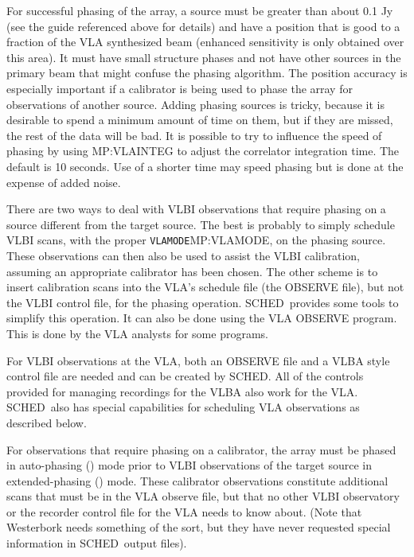 \documentclass{report}
\newcommand{\sched}{{\sc SCHED}}
\newcommand{\schedb}{{\sc SCHED~}}
\begin{document}
For successful phasing of the array, a source must be greater than
about 0.1 Jy (see the guide referenced above for details) and have a
position that is good to a fraction of the VLA synthesized beam
(enhanced sensitivity is only obtained over this area).  It must have
small structure phases and not have other sources in the primary beam
that might confuse the phasing algorithm.  The position accuracy is
especially important if a calibrator is being used to phase the array
for observations of another source.  Adding phasing sources is tricky,
because it is desirable to spend a minimum amount of time on them, but
if they are missed, the rest of the data will be bad.  It is possible
to try to influence the speed of phasing by using 
{MP:VLAINTEG} to adjust the correlator integration time.  The default
is 10 seconds.  Use of a shorter time may speed phasing but is done at
the expense of added noise.

There are two ways to deal with VLBI observations that require
phasing on a source different from the target source.  The best
is probably to simply schedule VLBI scans, with the proper \htmlref
{{\tt VLAMODE}}{MP:VLAMODE}, on the phasing source.  These observations
can then also be used to assist the VLBI calibration, assuming an
appropriate calibrator has been chosen.  The other scheme is to
insert calibration scans into the VLA's schedule file (the OBSERVE
file), but not the VLBI control file, for the phasing operation.
\schedb provides some tools to simplify this operation.  It can
also be done using the {\sc VLA OBSERVE} program.  This is done
by the VLA analysts for some programs.

For VLBI observations at the VLA, both an OBSERVE file and a VLBA
style control file are needed and can be created by \sched.  All of
the controls provided for managing recordings for the VLBA also work
for the VLA.  \schedb also has special capabilities for scheduling VLA
observations as described below.

For observations that require phasing on a calibrator, the array must
be phased in auto-phasing ()
mode prior to VLBI observations of the target source in
extended-phasing () mode.
These calibrator observations constitute additional scans that must be
in the VLA observe file, but that no other VLBI observatory or the
recorder control file for the VLA needs to know about. (Note that
Westerbork needs something of the sort, but they have never requested
special information in \schedb output files).
\end{document}
